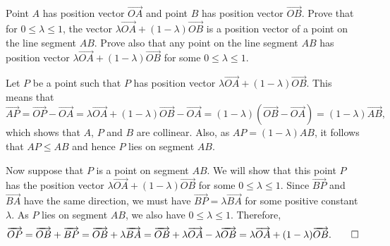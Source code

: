 \begin{question}
    Point $A$ has position vector $\overrightarrow{OA}$ and point $B$ has
    position vector $\overrightarrow{OB}$. Prove that for $0\leq \lambda \leq
    1$, the vector $\lambda \overrightarrow{OA} + (1 - \lambda)
    \overrightarrow{OB}$ is a position vector of a point on the line segment
    $AB$. Prove also that any point on the line segment $AB$ has position
    vector $\lambda \overrightarrow{OA} + (1 - \lambda)\overrightarrow{OB}$ for
    some $0\leq \lambda \leq 1$.
\end{question}
\begin{solution}
    Let $P$ be a point such that $P$ has position vector $\lambda
    \overrightarrow{OA} + (1 - \lambda) \overrightarrow{OB}$. This means that
    \[ \overrightarrow{AP} = \overrightarrow{OP} - \overrightarrow{OA} =
    \lambda \overrightarrow{OA} + (1 - \lambda) \overrightarrow{OB} -
    \overrightarrow{OA} = (1 - \lambda)(\overrightarrow{OB} - \overrightarrow{OA})
    = (1 - \lambda)\overrightarrow{AB}, \]
    which shows that $A$, $P$ and $B$ are collinear. Also, as $AP = (1 -
    \lambda)AB$, it follows that $AP \leq AB$ and hence $P$ lies on segment
    $AB$.
    
    Now suppose that $P$ is a point on segment $AB$. We will show that this
    point $P$ has the position vector $\lambda \overrightarrow{OA} + (1 -
    \lambda) \overrightarrow{OB}$ for some $0\leq \lambda \leq 1$. Since
    $\overrightarrow{BP}$ and $\overrightarrow{BA}$ have the same direction, we
    must have $\overrightarrow{BP} = \lambda\overrightarrow{BA}$ for some
    positive constant $\lambda$. As $P$ lies on segment $AB$, we also have $0
    \leq \lambda \leq 1$. Therefore, 
    \[ \overrightarrow{OP} = \overrightarrow{OB} + \overrightarrow{BP} =
        \overrightarrow{OB} + \lambda \overrightarrow{BA} = \overrightarrow{OB}
        + \lambda \overrightarrow{OA} - \lambda \overrightarrow{OB} = \lambda
        \overrightarrow{OA} + (1 - \lambda)\overrightarrow{OB}. \qedhere \]
\end{solution}

